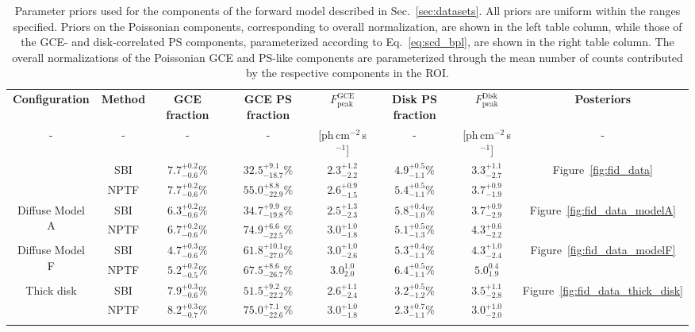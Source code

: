 \documentclass[prd,aps,10pt,nofootinbib,twocolumn,superscriptaddress,preprintnumbers,balancelastpage,longbibliography]{revtex4-1}
\newcommand\Tstrut{\rule{0pt}{2.6ex}}         %
\newcommand\Bstrut{\rule[-0.9ex]{0pt}{0pt}}   %
\begin{document}
%
\begin{table}[!t]
    \small
    \begin{center}
    \begin{tabular}{cc|cccccc}
    \toprule
    \textbf{Configuration}  & \textbf{Method}  & \textbf{GCE fraction}	 & \textbf{GCE PS fraction}  & $F_{\mathrm{peak}}^\mathrm{GCE}$	&  \textbf{Disk PS fraction} &  $F_{\mathrm{peak}}^\mathrm{Disk}$	&  \textbf{Posteriors}\Tstrut\Bstrut	\\   
    - & - & - & - & [ph\,cm$^{-2}$\,s$^{-1}$] & - & [ph\,cm$^{-2}$\,s$^{-1}$]	& -\Tstrut\Bstrut	\\   
    \Xhline{1\arrayrulewidth}
    \multirow{2}{*}{Baseline} & SBI & $7.7^{+0.2}_{-0.6}\%$ & $32.5^{+9.1}_{-18.7}\%$ & $2.3^{+1.2}_{-2.2}$ & $4.9^{+0.5}_{-1.1}\%$ & $3.3^{+1.1}_{-2.7}$ & \multirow{2}{*}{Figure~\ref{fig:fid_data}}\Tstrut \\
    & NPTF & $7.7^{+0.2}_{-0.6}\%$ & $55.0^{+8.8}_{-22.9}\%$ &  $2.6^{+0.9}_{-1.5}$ & $5.4^{+0.5}_{-1.1}\%$ & $3.7^{+0.9}_{-1.9}$\Bstrut &\\ 
    \hline
    \multirow{2}{*}{Diffuse Model A} & SBI & $6.3^{+0.2}_{-0.6}\%$ & $34.7^{+9.9}_{-19.8}\%$ & $2.5^{+1.3}_{-2.3}$ & $5.8^{+0.4}_{-1.0}\%$ & $3.7^{+0.9}_{-2.9}$ & \multirow{2}{*}{Figure~\ref{fig:fid_data_modelA}}\Tstrut  \\ 
    & NPTF & $6.7^{+0.2}_{-0.6}\%$ & $74.9^{+6.6}_{-22.5}\%$ & $3.0^{+1.0}_{-1.8}$ &  $5.1^{+0.5}_{-1.3}\%$ & $4.3^{+0.6}_{-2.2}$\Bstrut &\\
    \hline
    \multirow{2}{*}{Diffuse Model F} & SBI & $4.7^{+0.3}_{-0.6}\%$ & $61.8^{+10.1}_{-27.0}\%$ & $3.0^{+1.0}_{-2.6}$ & $5.3^{+0.4}_{-1.1}\%$ & $4.3^{+1.0}_{-2.4}$
    & \multirow{2}{*}{Figure~\ref{fig:fid_data_modelF}}\Tstrut \\
    & NPTF & $5.2^{+0.2}_{-0.5}\%$ & $67.5^{+8.6}_{-26.7}\%$ & $3.0^{1.0}_{2.0}$ & $6.4^{+0.5}_{-1.1}\%$ & $5.0^{0.4}_{1.9}$\Bstrut &\\
    \hline
    \multirow{2}{*}{Thick disk} & SBI & $7.9^{+0.3}_{-0.6}\%$ & $51.5^{+9.2}_{-22.2}\%$ & $2.6^{+1.1}_{-2.4}$ & $3.2^{+0.5}_{-1.2}\%$ & $3.5^{+1.1}_{-2.8}$ & \multirow{2}{*}{Figure~\ref{fig:fid_data_thick_disk}}\Tstrut \\
    & NPTF & $8.2^{+0.3}_{-0.7}\%$ & $75.0^{+7.1}_{-22.6}\%$ & $3.0^{+1.0}_{-1.8}$ & $2.3^{+0.7}_{-1.1}\%$ & $3.0^{+1.0}_{-2.0}$\Bstrut &\\
    \botrule
    \end{tabular}
    \end{center}
    \caption{Parameter priors used for the components of the forward model described in Sec.~\ref{sec:datasets}. All priors are uniform within the ranges specified. Priors on the Poissonian components, corresponding to overall normalization, are shown in the left table column, while those of the GCE- and disk-correlated PS components, parameterized according to Eq.~\eqref{eq:scd_bpl}, are shown in the right table column. The overall normalizations of the Poissonian GCE and PS-like components are parameterized through the mean number of counts contributed by the respective components in the ROI.}
    \label{tab:results}
    \end{table}    
\end{document}
